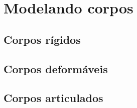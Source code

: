 \chapter{Modelando corpos}

\section{Corpos rígidos}

\section{Corpos deformáveis}

\section{Corpos articulados}
